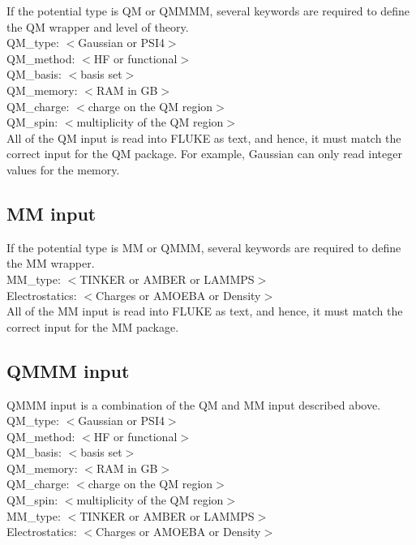 \documentclass[12pt]{report}
\begin{document}
If the potential type is QM or QMMMM, several keywords are required to define
the QM wrapper and level of theory. \\

QM\_type: $<$Gaussian or PSI4$>$ \\
QM\_method: $<$HF or functional$>$ \\
QM\_basis: $<$basis set$>$ \\
QM\_memory: $<$RAM in GB$>$ \\
QM\_charge: $<$charge on the QM region$>$ \\
QM\_spin: $<$multiplicity of the QM region$>$ \\

All of the QM input is read into FLUKE as text, and hence, it must match the
correct input for the QM package. For example, Gaussian can only read integer
values for the memory.

\subsection{MM input}

If the potential type is MM or QMMM, several keywords are required to define
the MM wrapper. \\

MM\_type: $<$TINKER or AMBER or LAMMPS$>$ \\
Electrostatics: $<$Charges or AMOEBA or Density$>$ \\

All of the MM input is read into FLUKE as text, and hence, it must match the
correct input for the MM package.

\subsection{QMMM input}

QMMM input is a combination of the QM and MM input described above. \\

QM\_type: $<$Gaussian or PSI4$>$ \\
QM\_method: $<$HF or functional$>$ \\
QM\_basis: $<$basis set$>$ \\
QM\_memory: $<$RAM in GB$>$ \\
QM\_charge: $<$charge on the QM region$>$ \\
QM\_spin: $<$multiplicity of the QM region$>$ \\
MM\_type: $<$TINKER or AMBER or LAMMPS$>$ \\
Electrostatics: $<$Charges or AMOEBA or Density$>$ \\
\end{document}
